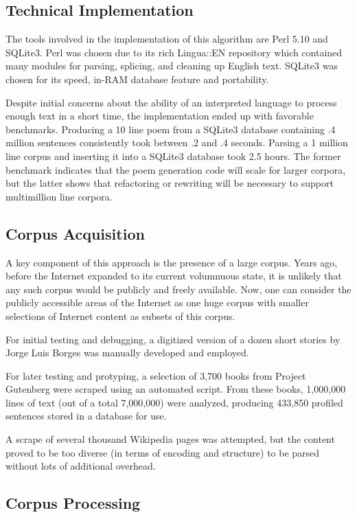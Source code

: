 \documentclass[10pt]{article}
\begin{document}
\subsection{Technical Implementation}
The tools involved in the implementation of this algorithm are Perl 5.10 and
SQLite3. Perl was chosen due to its rich Lingua::EN repository which contained
many modules for parsing, splicing, and cleaning up English text. SQLite3 was
chosen for its speed, in-RAM database feature and portability.

Despite initial concerns about the ability of an interpreted language to
process enough text in a short time, the implementation ended up with favorable
benchmarks. Producing a 10 line poem from a SQLite3 database containing .4
million sentences consistently took between .2 and .4 seconds. Parsing a 1
million line corpus and inserting it into a SQLite3 database took 2.5 hours.
The former benchmark indicates that the poem generation code will scale for
larger corpora, but the latter shows that refactoring or rewriting will be
necessary to support multimillion line corpora.

\subsection{Corpus Acquisition}
A key component of this approach is the presence of a large corpus. Years ago,
before the Internet expanded to its current volumnuous state, it is unlikely
that any such corpus would be publicly and freely available. Now, one can
consider the publicly accessible areas of the Internet as one huge corpus with
smaller selections of Internet content as subsets of this corpus.

For initial testing and debugging, a digitized version of a dozen short stories
by Jorge Luis Borges was manually developed and employed.

For later testing and protyping, a selection of 3,700 books from Project
Gutenberg were scraped using an automated script. From these books, 1,000,000
lines of text (out of a total 7,000,000) were analyzed, producing 433,850
profiled sentences stored in a database for use.

A scrape of several thousand Wikipedia pages was attempted, but the content
proved to be too diverse (in terms of encoding and structure) to be parsed
without lots of additional overhead.

\subsection{Corpus Processing}
\end{document}
